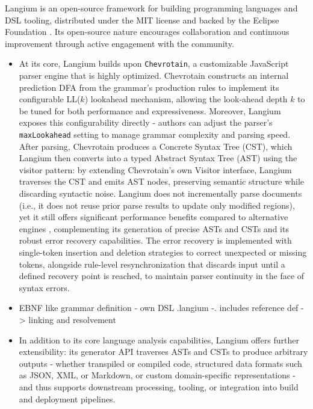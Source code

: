 Langium is an open-source framework for building programming languages and DSL tooling, distributed under the MIT license and backed by the Eclipse Foundation \cite{LangiumGit}.
Its open-source nature encourages collaboration and continuous improvement through active engagement with the community.
\begin{multicols}{2}
  \begin{itemize}
    \item At its core, Langium builds upon \verb|Chevrotain|, a customizable JavaScript parser engine that is highly optimized. Chevrotain constructs an internal prediction DFA \cite{sujew2022enabling}
          from the grammar's production rules to implement its configurable LL($k$) lookahead mechanism, allowing the look-ahead depth $k$ to be tuned for both performance and
          expressiveness. Moreover, Langium exposes this configurability directly - authors can adjust the parser's \verb|maxLookahead| setting to manage grammar complexity and
          parsing speed. After parsing, Chevrotain produces a Concrete Syntax Tree (CST), which Langium then converts into a typed Abstract Syntax Tree (AST) using the visitor pattern:
          by extending Chevrotain's own Visitor interface, Langium traverses the CST and emits AST nodes, preserving semantic structure while discarding syntactic noise.
          Langium does not incrementally parse documents (i.e., it does not reuse prior parse results to update only modified regions), yet it still offers significant performance
          benefits compared to alternative engines \cite{Chevrotain}, complementing its generation of precise ASTs and CSTs and its robust error recovery capabilities. The error recovery is
          implemented with single-token insertion and deletion strategies to correct unexpected or missing tokens, alongside rule-level resynchronization that discards input until a defined
          recovery point is reached, to maintain parser continuity in the face of syntax errors.
    \item EBNF like grammar definition - own DSL .langium -.  includes reference def -> linking and resolvement
    \item In addition to its core language analysis capabilities, Langium offers further extensibility: its generator API traverses ASTs and CSTs to produce arbitrary outputs
          - whether transpiled or compiled code, structured data formats such as JSON, XML, or Markdown, or custom domain-specific representations - and thus supports downstream
          processing, tooling, or integration into build and deployment pipelines.

\end{itemize}
\end{multicols}
